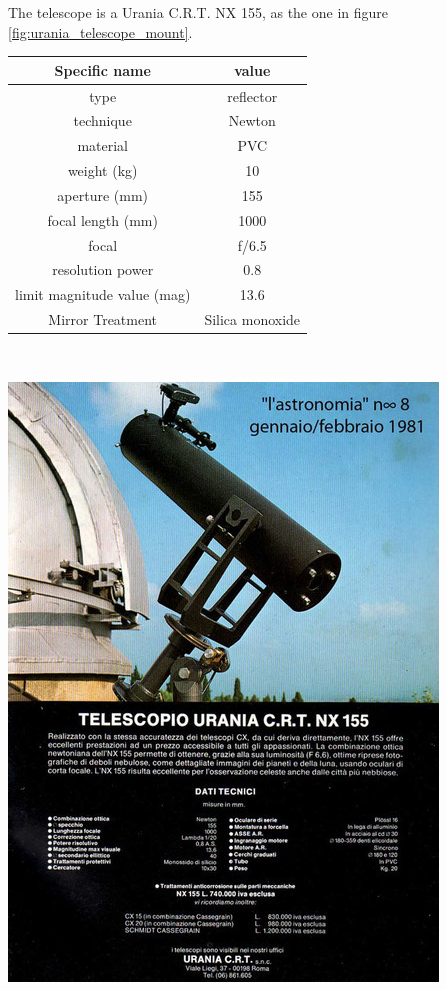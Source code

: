 \documentclass{article}
\begin{document}
\begin{multicols}{2}
        The telescope is a Urania C.R.T. NX 155, as the one in figure \ref{fig:urania_telescope_mount}.
        \\
        \begin{minipage}{0.5\textwidth}
            \centering
            \begin{tabular}{c|c}
                Specific name & value \\
                \hline
                type & reflector \\
                technique & Newton  \\
                material & PVC  \\
                weight (kg) & 10 \\
                aperture (mm) & 155 \\
                focal length (mm) & 1000 \\
                focal & f/6.5 \\
                resolution power & 0.8 \\
                limit magnitude value (mag) & 13.6 \\
                Mirror Treatment & Silica monoxide \\
                \hline
            \end{tabular}
        \end{minipage}
        \\
        \begin{minipage}{0.5\textwidth}
            \centering
            \includegraphics[scale=0.4]{urania_upper.jpg}
            \label{fig:urania_telescope_mount}
        \end{minipage}


\end{multicols}
\end{document}
